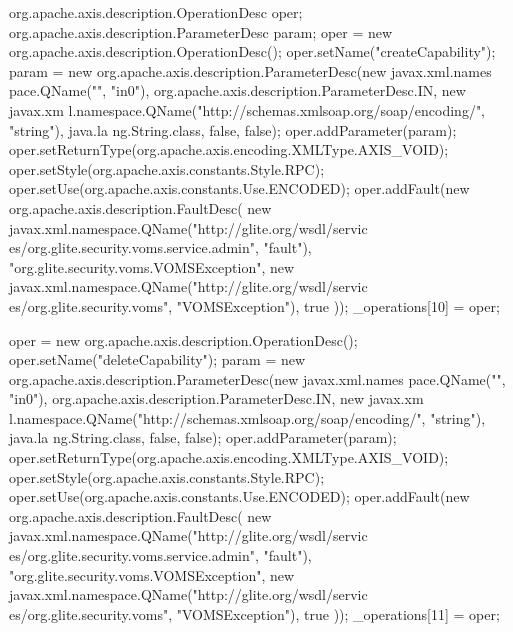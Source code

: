 \begin{DoxyCode}
                                             {
        org.apache.axis.description.OperationDesc oper;
        org.apache.axis.description.ParameterDesc param;
        oper = new org.apache.axis.description.OperationDesc();
        oper.setName("createCapability");
        param = new org.apache.axis.description.ParameterDesc(new javax.xml.names
      pace.QName("", "in0"), org.apache.axis.description.ParameterDesc.IN, new javax.xm
      l.namespace.QName("http://schemas.xmlsoap.org/soap/encoding/", "string"), java.la
      ng.String.class, false, false);
        oper.addParameter(param);
        oper.setReturnType(org.apache.axis.encoding.XMLType.AXIS_VOID);
        oper.setStyle(org.apache.axis.constants.Style.RPC);
        oper.setUse(org.apache.axis.constants.Use.ENCODED);
        oper.addFault(new org.apache.axis.description.FaultDesc(
                      new javax.xml.namespace.QName("http://glite.org/wsdl/servic
      es/org.glite.security.voms.service.admin", "fault"),
                      "org.glite.security.voms.VOMSException",
                      new javax.xml.namespace.QName("http://glite.org/wsdl/servic
      es/org.glite.security.voms", "VOMSException"), 
                      true
                     ));
        _operations[10] = oper;

        oper = new org.apache.axis.description.OperationDesc();
        oper.setName("deleteCapability");
        param = new org.apache.axis.description.ParameterDesc(new javax.xml.names
      pace.QName("", "in0"), org.apache.axis.description.ParameterDesc.IN, new javax.xm
      l.namespace.QName("http://schemas.xmlsoap.org/soap/encoding/", "string"), java.la
      ng.String.class, false, false);
        oper.addParameter(param);
        oper.setReturnType(org.apache.axis.encoding.XMLType.AXIS_VOID);
        oper.setStyle(org.apache.axis.constants.Style.RPC);
        oper.setUse(org.apache.axis.constants.Use.ENCODED);
        oper.addFault(new org.apache.axis.description.FaultDesc(
                      new javax.xml.namespace.QName("http://glite.org/wsdl/servic
      es/org.glite.security.voms.service.admin", "fault"),
                      "org.glite.security.voms.VOMSException",
                      new javax.xml.namespace.QName("http://glite.org/wsdl/servic
      es/org.glite.security.voms", "VOMSException"), 
                      true
                     ));
        _operations[11] = oper;

}
\end{DoxyCode}
